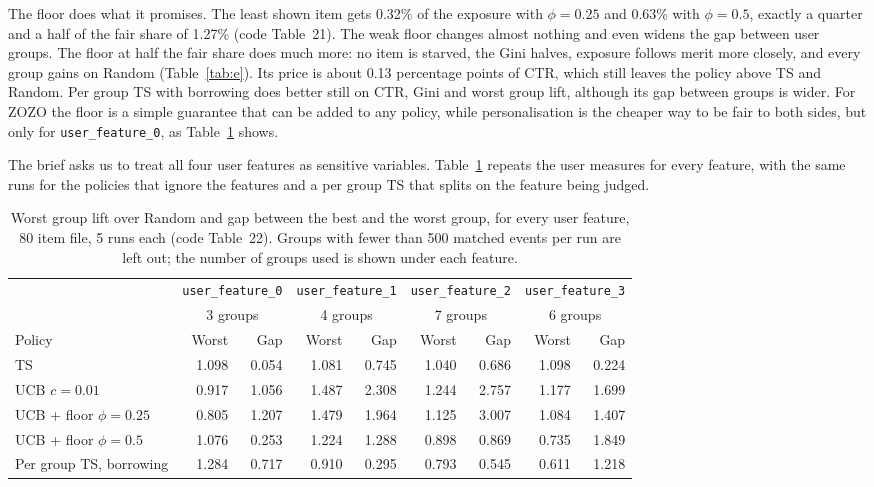 \documentclass[11pt]{article}
\begin{document}
The floor does what it promises. The least shown item gets 0.32\% of the
exposure with $\phi=0.25$ and 0.63\% with $\phi=0.5$, exactly a quarter and a
half of the fair share of 1.27\% (code Table~21). The weak floor changes
almost nothing and even widens the gap between user groups. The floor at
half the fair share does much more: no item is starved, the Gini halves,
exposure follows merit more closely, and every group gains on Random
(Table~\ref{tab:e}). Its price is about 0.13 percentage points of CTR, which
still leaves the policy above TS and Random. Per group TS with borrowing does
better still on CTR, Gini and worst group lift, although its gap between
groups is wider. For ZOZO the floor is a simple guarantee that can be added
to any policy, while personalisation is the cheaper way to be fair to both
sides, but only for \texttt{user\_feature\_0}, as Table~\ref{tab:e4} shows.

The brief asks us to treat all four user features as sensitive variables.
Table~\ref{tab:e4} repeats the user measures for every feature, with the
same runs for the policies that ignore the features and a per group TS
that splits on the feature being judged.

\begin{table}[H]
  \centering
  \caption{Worst group lift over Random and gap between the best and the worst
    group, for every user feature, 80 item file, 5 runs each (code Table~22).
    Groups with fewer than 500 matched events per run are left out; the
    number of groups used is shown under each feature.}
  \label{tab:e4}
  \footnotesize
  \setlength{\tabcolsep}{4pt}
  \begin{tabular}{lrrrrrrrr}
    \toprule
    & \multicolumn{2}{c}{\texttt{user\_feature\_0}} & \multicolumn{2}{c}{\texttt{user\_feature\_1}}
    & \multicolumn{2}{c}{\texttt{user\_feature\_2}} & \multicolumn{2}{c}{\texttt{user\_feature\_3}} \\
    & \multicolumn{2}{c}{3 groups} & \multicolumn{2}{c}{4 groups}
    & \multicolumn{2}{c}{7 groups} & \multicolumn{2}{c}{6 groups} \\
    \cmidrule(lr){2-3}\cmidrule(lr){4-5}\cmidrule(lr){6-7}\cmidrule(lr){8-9}
    Policy & Worst & Gap & Worst & Gap & Worst & Gap & Worst & Gap \\
    \midrule
    TS                       & 1.098 & 0.054 & 1.081 & 0.745 & 1.040 & 0.686 & 1.098 & 0.224 \\
    UCB $c=0.01$             & 0.917 & 1.056 & 1.487 & 2.308 & 1.244 & 2.757 & 1.177 & 1.699 \\
    UCB + floor $\phi=0.25$  & 0.805 & 1.207 & 1.479 & 1.964 & 1.125 & 3.007 & 1.084 & 1.407 \\
    UCB + floor $\phi=0.5$   & 1.076 & 0.253 & 1.224 & 1.288 & 0.898 & 0.869 & 0.735 & 1.849 \\
    Per group TS, borrowing  & 1.284 & 0.717 & 0.910 & 0.295 & 0.793 & 0.545 & 0.611 & 1.218 \\
    \bottomrule
  \end{tabular}
\end{table}
\end{document}
